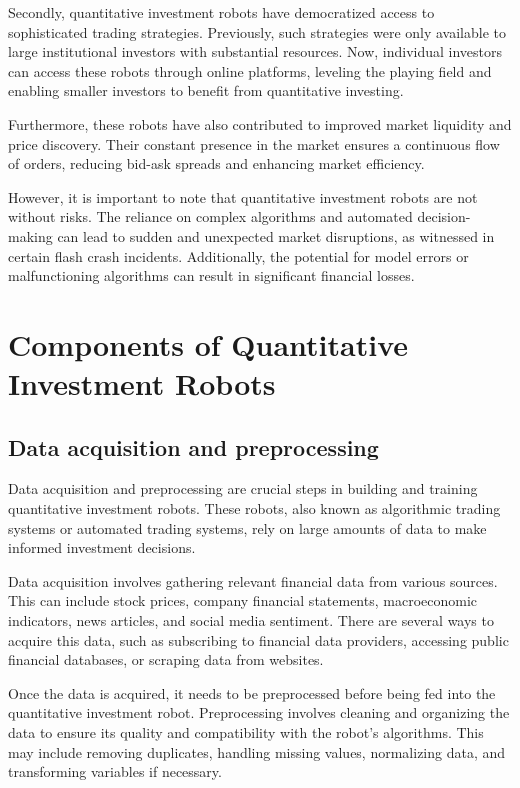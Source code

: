 \documentclass[UTF8]{ctexart}
\begin{document}
Secondly, quantitative investment robots have democratized access to sophisticated trading strategies. Previously, such strategies were only available to large institutional investors with substantial resources. Now, individual investors can access these robots through online platforms, leveling the playing field and enabling smaller investors to benefit from quantitative investing.

Furthermore, these robots have also contributed to improved market liquidity and price discovery. Their constant presence in the market ensures a continuous flow of orders, reducing bid-ask spreads and enhancing market efficiency.

However, it is important to note that quantitative investment robots are not without risks. The reliance on complex algorithms and automated decision-making can lead to sudden and unexpected market disruptions, as witnessed in certain flash crash incidents. Additionally, the potential for model errors or malfunctioning algorithms can result in significant financial losses.

\section{Components of Quantitative Investment Robots}
\subsection{Data acquisition and preprocessing}
Data acquisition and preprocessing are crucial steps in building and training quantitative investment robots. These robots, also known as algorithmic trading systems or automated trading systems, rely on large amounts of data to make informed investment decisions.

Data acquisition involves gathering relevant financial data from various sources. This can include stock prices, company financial statements, macroeconomic indicators, news articles, and social media sentiment. There are several ways to acquire this data, such as subscribing to financial data providers, accessing public financial databases, or scraping data from websites.

Once the data is acquired, it needs to be preprocessed before being fed into the quantitative investment robot. Preprocessing involves cleaning and organizing the data to ensure its quality and compatibility with the robot's algorithms. This may include removing duplicates, handling missing values, normalizing data, and transforming variables if necessary.
\end{document}
